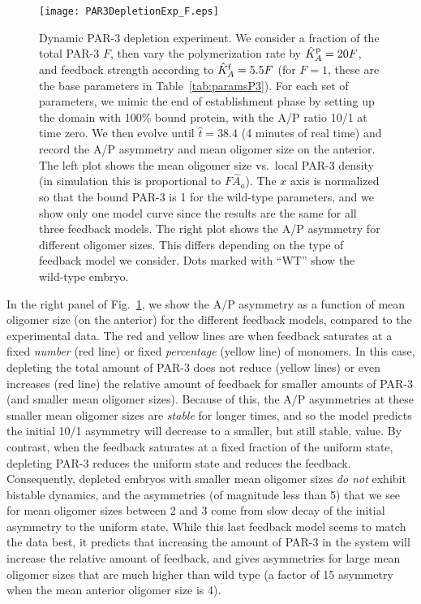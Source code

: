 \documentclass[11pt]{article}
\newcommand{\6}[1]{#1_{\text{6}}}
\newcommand{\3}[1]{#1_{\text{3}}}
\begin{document}
\begin{figure}
\centering
\texttt{[image: PAR3DepletionExp\_F.eps]}
\caption{\label{fig:P3DeplF}Dynamic PAR-3 depletion experiment. We consider a fraction of the total PAR-3 $F$, then vary the polymerization rate by $\hat{K}^\text{p}_A=20F$, and feedback strength according to $\hat{K}^\text{f}_A=5.5F$ (for $F=1$, these are the base parameters in Table\ \ref{tab:paramsP3}). For each set of parameters, we mimic the end of establishment phase by setting up the domain with 100\% bound protein, with the A/P ratio 10/1 at time zero. We then evolve until $\hat t=38.4$ (4 minutes of real time) and record the A/P asymmetry and mean oligomer size on the anterior. The left plot shows the mean oligomer size vs.\ local PAR-3 density (in simulation this is proportional to $F \hat A_a$). The $x$ axis is normalized so that the bound PAR-3 is 1 for the wild-type parameters, and we show only one model curve since the results are the same for all three feedback models. The right plot shows the A/P asymmetry for different oligomer sizes. This differs depending on the type of feedback model we consider. Dots marked with ``WT'' show the wild-type embryo.}
\end{figure}

In the right panel of Fig.\ \ref{fig:P3DeplF}, we show the A/P asymmetry as a function of mean oligomer size (on the anterior) for the different feedback models, compared to the experimental data. The red and yellow lines are when feedback saturates at a fixed \emph{number} (red line) or fixed \emph{percentage} (yellow line) of monomers. In this case, depleting the total amount of PAR-3 does not reduce (yellow lines) or even increases (red line) the relative amount of feedback for smaller amounts of PAR-3 (and smaller mean oligomer sizes). Because of this, the A/P asymmetries at these smaller mean oligomer sizes are \emph{stable} for longer times, and so the model predicts the initial 10/1 asymmetry will decrease to a smaller, but still stable, value. By contrast, when the feedback saturates at a fixed fraction of the uniform state, depleting PAR-3 reduces the uniform state and reduces the feedback. Consequently, depleted embryos with smaller mean oligomer sizes \emph{do not} exhibit bistable dynamics, and the asymmetries (of magnitude less than 5) that we see for mean oligomer sizes between 2 and 3 come from slow decay of the initial asymmetry to the uniform state. While this last feedback model seems to match the data best, it predicts that increasing the amount of PAR-3 in the system will increase the relative amount of feedback, and gives asymmetries for large mean oligomer sizes that are much higher than wild type (a factor of 15 asymmetry when the mean anterior oligomer size is 4). 
\end{document}
